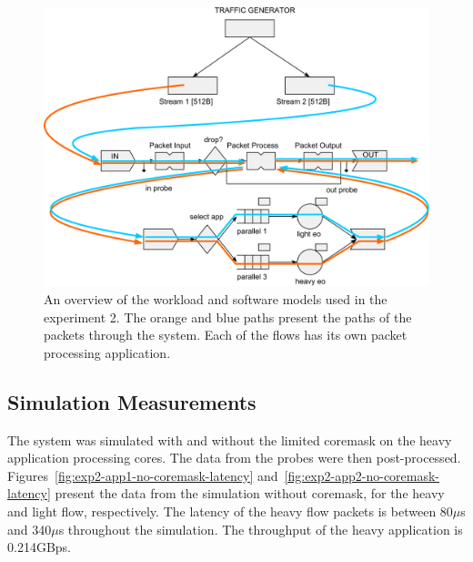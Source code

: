 \begin{figure}[]
  \begin{center}
    \includegraphics[width=\textwidth]{images/pse-models/exp2-software.pdf}
    \caption{An overview of the workload and software  models used in the experiment 2. The orange and blue paths present the paths of the packets through the system. Each of the flows has its own packet processing application.}
    \label{fig:exp2-software}
  \end{center}
\end{figure}

\subsection{Simulation Measurements}
\label{sec:exp2-simulation-measurements}

The system was simulated with and without the limited coremask on the heavy application processing cores. The data from the probes were then post-processed. Figures~\ref{fig:exp2-app1-no-coremask-latency} and~\ref{fig:exp2-app2-no-coremask-latency} present the data from the simulation without coremask, for the heavy and light flow, respectively. The latency of the heavy flow packets is between 80$\mu$s and 340$\mu$s throughout the simulation. The throughput of the heavy application is 0.214GBps.

